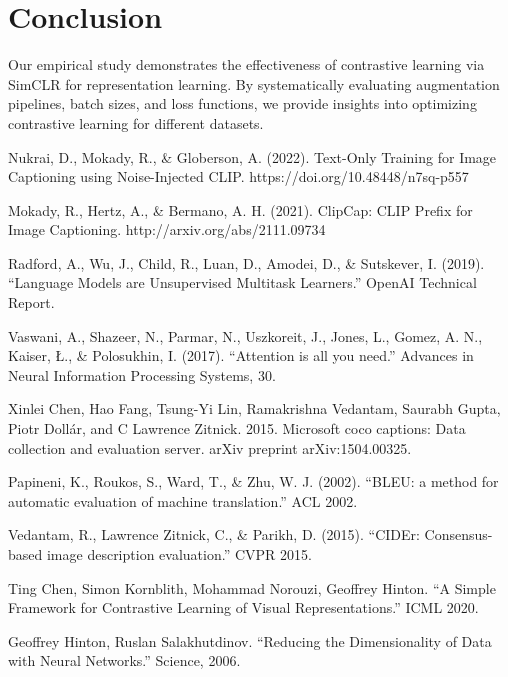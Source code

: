 \documentclass[11pt]{article}
\begin{document}
\section{Conclusion}
Our empirical study demonstrates the effectiveness of contrastive learning via SimCLR for representation
learning. By systematically evaluating augmentation pipelines, batch sizes, and loss functions, we provide
insights into optimizing contrastive learning for different datasets.
\pagebreak
\begin{thebibliography}{99}
    Nukrai, D., Mokady, R., \& Globerson, A. (2022). Text-Only Training for Image Captioning using Noise-Injected CLIP. https://doi.org/10.48448/n7sq-p557
    
    Mokady, R., Hertz, A., \& Bermano, A. H. (2021). ClipCap: CLIP Prefix for Image Captioning. http://arxiv.org/abs/2111.09734
    
    Radford, A., Wu, J., Child, R., Luan, D., Amodei, D., \& Sutskever, I. (2019). ``Language Models are Unsupervised Multitask Learners.'' OpenAI Technical Report.

    Vaswani, A., Shazeer, N., Parmar, N., Uszkoreit, J., Jones, L., Gomez, A. N., Kaiser, Ł., \& Polosukhin, I. (2017). ``Attention is all you need.'' 
    Advances in Neural Information Processing Systems, 30.

    Xinlei Chen, Hao Fang, Tsung-Yi Lin, Ramakrishna Vedantam, Saurabh Gupta, Piotr Dollár, and C Lawrence Zitnick. 2015. Microsoft coco captions: Data collection and evaluation server. arXiv preprint arXiv:1504.00325.
    
    Papineni, K., Roukos, S., Ward, T., \& Zhu, W. J. (2002). ``BLEU: a method for automatic evaluation of machine translation.'' ACL 2002.
    
    Vedantam, R., Lawrence Zitnick, C., \& Parikh, D. (2015). ``CIDEr: Consensus-based image description evaluation.'' CVPR 2015.
    
    Ting Chen, Simon Kornblith, Mohammad Norouzi, Geoffrey Hinton. ``A Simple Framework for Contrastive Learning of Visual Representations.'' ICML 2020.
    
    Geoffrey Hinton, Ruslan Salakhutdinov. ``Reducing the Dimensionality of Data with Neural Networks.'' Science, 2006.
    \end{thebibliography}
\end{document}

